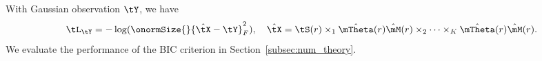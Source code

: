 \documentclass[lettersize,onecolumn,journal]{IEEEtran}
\theoremstyle{definition}
\theoremstyle{definition}
\begin{document}
{With Gaussian observation $\tY$, we have
\begin{equation}
    \tL_{\tY} = - \log(\onormSize{}{\hat \tX - \tY}_F^2), \quad \hat \tX = \tS(r) \times_1 \hat \mTheta(r) \hat \mM(r) \times_2 \cdots \times_K \hat \mTheta(r) \hat \mM(r).
\end{equation}
We evaluate the performance of the BIC criterion in Section~\ref{subsec:num_theory}.





}




\end{document}
